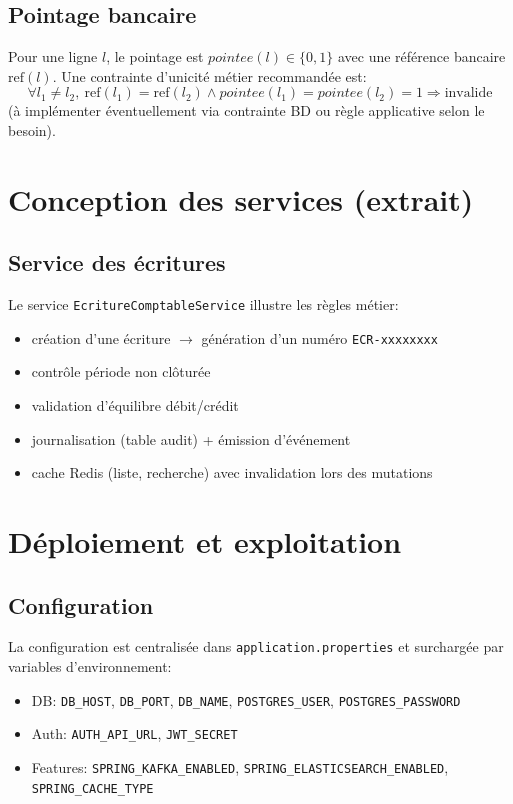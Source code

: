 \documentclass[12pt,a4paper]{report}
\begin{document}
\section{Pointage bancaire}
Pour une ligne \(l\), le pointage est \(pointee(l) \in \{0,1\}\) avec une référence bancaire \(\mathrm{ref}(l)\).
Une contrainte d'unicité métier recommandée est:
\[
\forall l_1 \ne l_2,\ \mathrm{ref}(l_1)=\mathrm{ref}(l_2) \wedge pointee(l_1)=pointee(l_2)=1 \Rightarrow \text{invalide}
\]
(à implémenter éventuellement via contrainte BD ou règle applicative selon le besoin).

\chapter{Conception des services (extrait)}
\section{Service des écritures}
Le service \texttt{EcritureComptableService} illustre les règles métier:
\begin{itemize}
  \item création d'une écriture \(\rightarrow\) génération d'un numéro \texttt{ECR-xxxxxxxx}
  \item contrôle période non clôturée
  \item validation d'équilibre débit/crédit
  \item journalisation (table audit) + émission d'événement
  \item cache Redis (liste, recherche) avec invalidation lors des mutations
\end{itemize}

\chapter{Déploiement et exploitation}
\section{Configuration}
La configuration est centralisée dans \texttt{application.properties} et surchargée par variables d'environnement:
\begin{itemize}
  \item DB: \texttt{DB\_HOST}, \texttt{DB\_PORT}, \texttt{DB\_NAME}, \texttt{POSTGRES\_USER}, \texttt{POSTGRES\_PASSWORD}
  \item Auth: \texttt{AUTH\_API\_URL}, \texttt{JWT\_SECRET}
  \item Features: \texttt{SPRING\_KAFKA\_ENABLED}, \texttt{SPRING\_ELASTICSEARCH\_ENABLED}, \texttt{SPRING\_CACHE\_TYPE}
\end{itemize}
\end{document}
